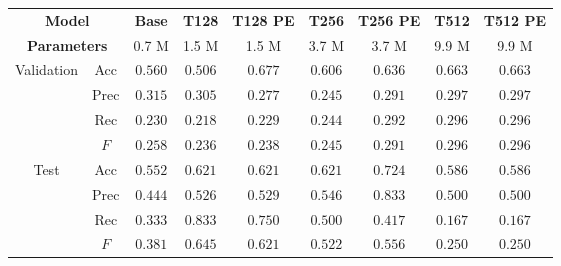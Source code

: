 \begin{tabular}{cc|ccccccc}
    \multicolumn{2}{c|}{\textbf{Model}} & \textbf{Base} & \textbf{T128} & \textbf{T128 PE} & \textbf{T256} & \textbf{T256 PE} & \textbf{T512} & \textbf{T512 PE}\\
    \multicolumn{2}{c|}{\textbf{Parameters}} & 0.7 M & 1.5 M & 1.5 M & 3.7 M & 3.7 M & 9.9 M & 9.9 M \\\hline
    \multirow{4}{*}{Validation} & Acc  & $0.560$          & $0.506$          & $\mathbf{0.677}$ & $0.606$ & $0.636$ & $0.663$ & $0.663$ \\
    & Prec & $\mathbf{0.315}$ & $0.305$          & $0.277$          & $0.245$ & $0.291$          & $0.297$          & $0.297$          \\
    & Rec  & $0.230$          & $0.218$          & $0.229$          & $0.244$ & $0.292$          & $\mathbf{0.296}$ & $\mathbf{0.296}$ \\
    & $F$  & $0.258$          & $0.236$          & $0.238$          & $0.245$ & $0.291$          & $\mathbf{0.296}$ & $\mathbf{0.296}$ \\\hline
    \multirow{4}{*}{Test}       & Acc  & $0.552$          & $0.621$          & $0.621$          & $0.621$ & $\mathbf{0.724}$ & $0.586$ & $0.586$ \\
    & Prec & $0.444$          & $0.526$          & $0.529$          & $0.546$ & $\mathbf{0.833}$ & $0.500$          & $0.500$          \\
    & Rec  & $0.333$          & $\mathbf{0.833}$ & $0.750$          & $0.500$ & $0.417$          & $0.167$          & $0.167$          \\
    & $F$  & $0.381$          & $\mathbf{0.645}$ & $0.621$          & $0.522$ & $0.556$          & $0.250$          & $0.250$          \\
\end{tabular}
